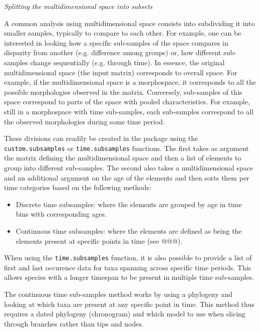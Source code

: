 \documentclass[12pt,letterpaper]{article}
\renewcommand{\subsection}[1]{%
\bigskip
\begin{center}
\begin{large}
\normalfont\itshape #1
\end{large}
\end{center}}
\begin{document}
\subsection{Splitting the multidimensional space into subsets}
A common analysis using multidimensional space consists into subdividing it into smaller samples, typically to compare to each other.
For example, one can be interested in looking how a specific sub-samples of the space compares in disparity from another (e.g. difference among groups) or, how different sub-samples change sequentially (e.g. through time).
In essence, the original multidimensional space (the input matrix) corresponds to overall space.
For example, if the multidimensional space is a morphospace, it corresponds to all the possible morphologies observed in the matrix.
Conversely, sub-samples of this space correspond to parts of the space with pooled characteristics.
For example, still in a morphospace with time sub-samples, each sub-samples correspond to all the observed morphologies during some time period.

These divisions can readily be created in the package using the \texttt{custom.subsamples} or \texttt{time.subsamples} functions.
The first takes as argument the matrix defining the multidimensional space and then a list of elements to group into different sub-samples.
The second also takes a multidimensional space and an additional argument on the age of the elements and then sorts them per time categories based on the following methods:

\begin{itemize}
    \item Discrete time subsamples: where the elements are grouped by age in time bins with corresponding ages.
    \item Continuous time subsamples: where the elements are defined as being the elements present at specific points in time (see @@@).
\end{itemize}

When using the \texttt{time.subsamples} function, it is also possible to provide a list of first and last occurence data for taxa spanning across specific time periods.
This allows species with a longer timespan to be present in multiple time sub-samples.

The continuous time sub-samples method works by using a phylogeny and looking at which taxa are present at any specific point in time.
This method thus requires a dated phylogeny (chronogram) and which model to use when slicing through branches rather than tips and nodes.
\end{document}

